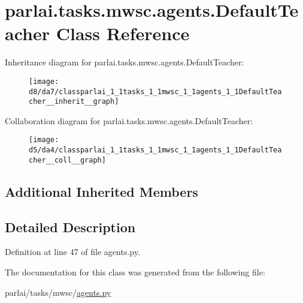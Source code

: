 \hypertarget{classparlai_1_1tasks_1_1mwsc_1_1agents_1_1DefaultTeacher}{}\section{parlai.\+tasks.\+mwsc.\+agents.\+Default\+Teacher Class Reference}
\label{classparlai_1_1tasks_1_1mwsc_1_1agents_1_1DefaultTeacher}


Inheritance diagram for parlai.\+tasks.\+mwsc.\+agents.\+Default\+Teacher\+:
\nopagebreak
\begin{figure}[H]
\begin{center}
\leavevmode
\texttt{[image: d8/da7/classparlai\_1\_1tasks\_1\_1mwsc\_1\_1agents\_1\_1DefaultTeacher\_\_inherit\_\_graph]}
\end{center}
\end{figure}


Collaboration diagram for parlai.\+tasks.\+mwsc.\+agents.\+Default\+Teacher\+:
\nopagebreak
\begin{figure}[H]
\begin{center}
\leavevmode
\texttt{[image: d5/da4/classparlai\_1\_1tasks\_1\_1mwsc\_1\_1agents\_1\_1DefaultTeacher\_\_coll\_\_graph]}
\end{center}
\end{figure}
\subsection*{Additional Inherited Members}


\subsection{Detailed Description}


Definition at line 47 of file agents.\+py.



The documentation for this class was generated from the following file\+:\begin{DoxyCompactItemize}
\item 
parlai/tasks/mwsc/\hyperlink{parlai_2tasks_2mwsc_2agents_8py}{agents.\+py}\end{DoxyCompactItemize}

